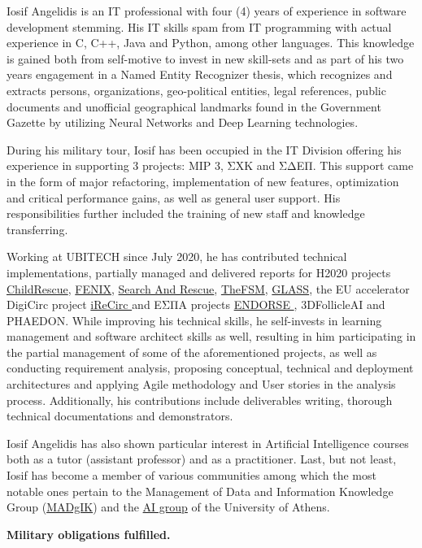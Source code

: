 \documentclass[a4paper,oneside,10pt]{article}
\begin{document}
\begin{sloppypar}
	Iosif Angelidis is an IT professional with four (4) years of experience in software development stemming. His IT skills spam from IT programming with actual experience in C, C++, Java and Python, among other languages. This knowledge is gained both from self-motive to invest in new skill-sets and as part of his two years engagement in a Named Entity Recognizer thesis, which recognizes and extracts persons, organizations, geo-political entities, legal references, public documents and unofficial geographical landmarks found in the Government Gazette by utilizing Neural Networks and Deep Learning technologies.

	During his military tour, Iosif has been occupied in the IT Division offering his experience in supporting 3 projects: MIP 3, ΣΧΚ and ΣΔΕΠ. This support came in the form of major refactoring, implementation of new features, optimization and critical performance gains, as well as general user support. His responsibilities further included the training of new staff and knowledge transferring.

	Working at UBITECH since July 2020, he has contributed technical implementations, partially managed and delivered reports for H2020 projects \href{https://cordis.europa.eu/project/id/780938}{ChildRescue}, \href{https://cordis.europa.eu/project/id/760792}{FENIX}, \href{https://cordis.europa.eu/project/id/882897}{Search And Rescue}, \href{https://cordis.europa.eu/project/id/871703}{TheFSM}, \href{https://cordis.europa.eu/project/id/959879}{GLASS}, the EU accelerator DigiCirc project \href{https://digicirc.eu/irecirc/}{iReCirc } and ΕΣΠΑ projects \href{https://endorse.biosim.ntua.gr/}{ENDORSE }, 3DFollicleAI and PHAEDON. While improving his technical skills, he self-invests in learning management and software architect skills as well, resulting in him participating in the partial management of some of the aforementioned projects, as well as conducting requirement analysis, proposing conceptual, technical and deployment architectures and applying Agile methodology and User stories in the analysis process. Additionally, his contributions include deliverables writing, thorough technical documentations and demonstrators.

	Iosif Angelidis has also shown particular interest in Artificial Intelligence courses both as a tutor (assistant professor) and as a practitioner. 
	Last, but not least, Iosif has become a member of various communities among which the most notable ones pertain to the Management of Data and Information Knowledge Group (\href{http://www.madgik.di.uoa.gr}{MADgIK}) and the \href{http://ai.di.uoa.gr/}{AI group} of the University of Athens. 

	\textbf{Military obligations fulfilled.}
	
	
\end{sloppypar}
\end{document}
